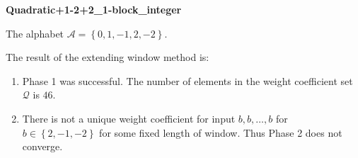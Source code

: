 \begin{exmp}
\textbf{ Quadratic+1-2+2\_1-block\_integer }

\label{ex:Quadratic+1-2+21-blockinteger}

The alphabet $\mathcal{A} =\left\{0, 1, -1, 2, -2\right\}$.

The result of the extending window method is:
\begin{enumerate}
    \item Phase 1 was successful.
The number of elements in the weight coefficient set $\mathcal{Q}$ is $46$.

    \item There is not a unique weight coefficient for input $b,b,\dots,b$ for $b\in\left\{2, -1, -2\right\}$ for some fixed length of window. Thus Phase 2 does not converge.

\end{enumerate}
\end{exmp}

